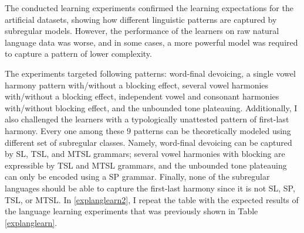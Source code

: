 The conducted learning experiments confirmed the learning expectations for the artificial datasets, showing how different linguistic patterns are captured by subregular models.
However, the performance of the learners on raw natural language data was worse, and in some cases, a more powerful model was required to capture a pattern of lower complexity.

The experiments targeted following patterns: word-final devoicing, a single vowel harmony pattern with/without a blocking effect, several vowel harmonies with/without a blocking effect, independent vowel and consonant harmonies with/without blocking effect, and the unbounded tone plateauing.
Additionally, I also challenged the learners with a typologically unattested pattern of first-last harmony.
Every one among these $9$ patterns can be theoretically modeled using different set of subregular classes.
Namely, word-final devoicing can be captured by SL, TSL, and MTSL grammars; several vowel harmonies with blocking are expressible by TSL and MTSL grammars, and the unbounded tone plateauing can only be encoded using a SP grammar.
Finally, none of the subregular languages should be able to capture the first-last harmony since it is not SL, SP, TSL, or MTSL.
In \ref{explanglearn2}, I repeat the table with the expected results of the language learning experiments that was previously shown in Table \ref{explanglearn}.


